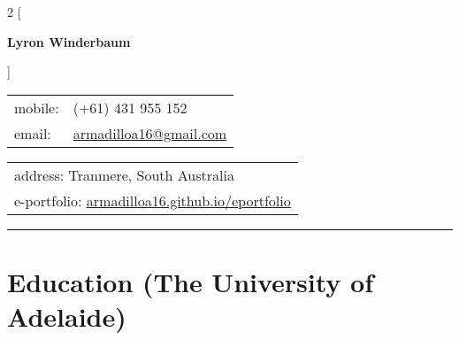 \documentclass[a4paper,12pt]{report}
\begin{document}
 

\begin{multicols}{2}
[
\begin{center}
{\Large \textbf{Lyron Winderbaum}} \\ \vspace{4mm}
\end{center}
]

\begin{flushleft}
\begin{tabular}{ll}
mobile: & (+61) 431 955 152 \\
email: & \href{mailto:armadilloa16@gmail.com}{armadilloa16@gmail.com} 
\end{tabular}
\end{flushleft}

\begin{flushright}
\begin{tabular}{l}
address: Tranmere, South Australia \\
e-portfolio: \href{https://armadilloa16.github.io/eportfolio/}{{\footnotesize armadilloa16.github.io/eportfolio}} 
\end{tabular}
\end{flushright}
\end{multicols}                                  

\vspace{0.2cm}
\hrule
\vspace{-0.2cm}

%

\section*{Education (The University of Adelaide)}
\end{document}
